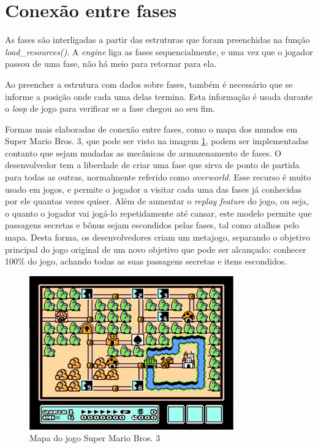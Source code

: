 \documentclass[brazil]{abnt}
\begin{document}
\section{Conexão entre fases}

As fases são interligadas a partir das estruturas que foram preenchidas na função \textit{load\_resources()}. A \textit{engine} liga as fases sequencialmente, e uma vez que o jogador passou de uma fase, não há meio para retornar para ela.

Ao preencher a estrutura com dados sobre fases, também é necessário que se informe a posição onde cada uma delas termina. Esta informação é usada durante o \textit{loop} de jogo para verificar se a fase chegou ao seu fim.

Formas mais elaboradas de conexão entre fases, como o mapa dos mundos em Super Mario Bros. 3, que pode ser visto na imagem \ref{fig:smb3}, podem ser implementadas contanto que sejam mudadas as mecânicas de armazenamento de fases. O desenvolvedor tem a liberdade de criar uma fase que sirva de ponto de partida para todas as outras, normalmente referido como \textit{overworld}. Esse recurso é muito usado em jogos, e permite o jogador a visitar cada uma das fases já conhecidas por ele quantas vezes quiser. Além de aumentar o \textit{replay feature} do jogo, ou seja, o quanto o jogador vai jogá-lo repetidamente até cansar, este modelo permite que passagens secretas e bônus sejam escondidos pelas fases, tal como atalhos pelo mapa. Desta forma, os desenvolvedores criam um metajogo, separando o objetivo principal do jogo original de um novo objetivo que pode ser alcançado: conhecer 100\% do jogo, achando todas as suas passagens secretas e itens escondidos.

\begin{figure}[h!]
\centering
\includegraphics{imgs/smb3.png}
\caption{Mapa do jogo Super Mario Bros. 3}
\label{fig:smb3}
\end{figure}
\end{document}
